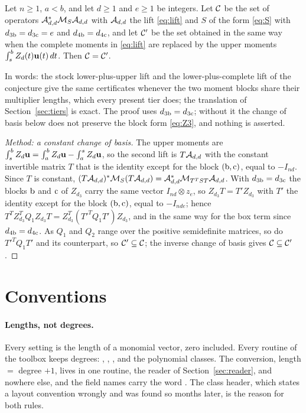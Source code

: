 \begin{proposition}\label{prop:span}
Let $n\ge1$, $a<b$, and let $d\ge1$ and $e\ge1$ be integers. Let $\mathcal{C}$ be the set of operators $\mathcal{A}_{d,d}^*\mathcal{M}_S\mathcal{A}_{d,d}$ with $\mathcal{A}_{d,d}$ the lift \eqref{eq:lift} and $S$ of the form \eqref{eq:S} with $d_{3\mathrm{b}}=d_{3\mathrm{c}}=e$ and $d_{4\mathrm{b}}=d_{4\mathrm{c}}$, and let $\mathcal{C}'$ be the set obtained in the same way when the complete moments in \eqref{eq:lift} are replaced by the upper moments $\int_s^bZ_d(t)\mathbf{u}(t)\,dt$. Then $\mathcal{C}=\mathcal{C}'$.
\end{proposition}
In words: the stock lower-plus-upper lift and the lower-plus-complete lift of the conjecture give the same certificates whenever the two moment blocks share their multiplier lengths, which every present tier does; the translation of Section~\ref{sec:tiers} is exact. The proof uses $d_{3\mathrm{b}}=d_{3\mathrm{c}}$; without it the change of basis below does not preserve the block form \eqref{eq:Z3}, and nothing is asserted.

\begin{proof}[Method: a constant change of basis]
The upper moments are $\int_s^bZ_d\mathbf{u}=\int_a^bZ_d\mathbf{u}-\int_a^sZ_d\mathbf{u}$, so the second lift is $T\mathcal{A}_{d,d}$ with the constant invertible matrix $T$ that is the identity except for the block $(\mathrm{b},\mathrm{c})$, equal to $-I_{nd}$. Since $T$ is constant, $(T\mathcal{A}_{d,d})^*\mathcal{M}_S(T\mathcal{A}_{d,d})=\mathcal{A}_{d,d}^*\mathcal{M}_{T^TST}\mathcal{A}_{d,d}$. With $d_{3\mathrm{b}}=d_{3\mathrm{c}}$ the blocks $\mathrm{b}$ and $\mathrm{c}$ of $Z_{d_3}$ carry the same vector $I_{nd}\otimes z_e$, so $Z_{d_3}T=T'Z_{d_3}$ with $T'$ the identity except for the block $(\mathrm{b},\mathrm{c})$, equal to $-I_{nde}$; hence $T^TZ_{d_3}^TQ_1Z_{d_3}T=Z_{d_3}^T(T'^TQ_1T')Z_{d_3}$, and in the same way for the box term since $d_{4\mathrm{b}}=d_{4\mathrm{c}}$. As $Q_1$ and $Q_2$ range over the positive semidefinite matrices, so do $T'^TQ_1T'$ and its counterpart, so $\mathcal{C}'\subseteq\mathcal{C}$; the inverse change of basis gives $\mathcal{C}\subseteq\mathcal{C}'$.
\end{proof}

\section{Conventions}\label{sec:conv}

\paragraph{Lengths, not degrees.} Every setting is the length of a monomial vector, zero included. Every routine of the toolbox keeps degrees: , , ,  and the polynomial classes. The conversion, length $=$ degree $+1$, lives in one routine, the reader of Section~\ref{sec:reader}, and nowhere else, and the field names carry the word . The  class header, which states a layout convention wrongly and was found so months later, is the reason for both rules.

